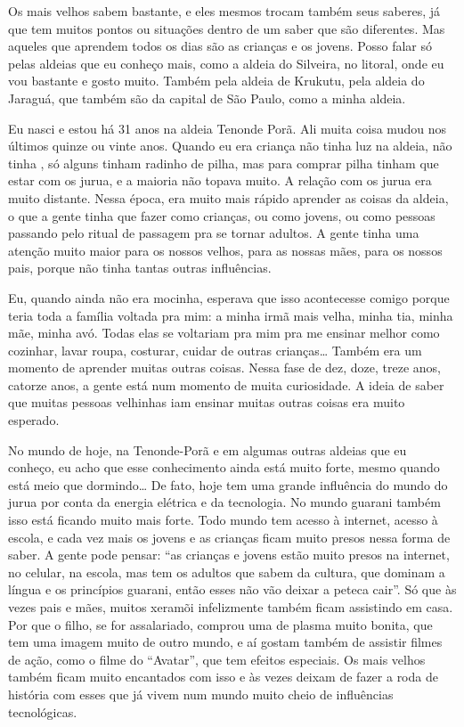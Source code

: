 Os mais velhos sabem bastante, e eles mesmos trocam também seus saberes,
já que tem muitos pontos ou situações dentro de um saber que são
diferentes. Mas aqueles que aprendem todos os dias são as crianças e os
jovens. Posso falar só pelas aldeias que eu conheço mais, como a aldeia
do Silveira, no litoral, onde eu vou bastante e gosto muito. Também
pela aldeia de Krukutu, pela aldeia do Jaraguá, que também são da
capital de São Paulo, como a minha aldeia.

Eu nasci e estou há 31 anos na aldeia Tenonde Porã. Ali muita coisa
mudou nos últimos quinze ou vinte anos. Quando eu era criança não tinha
luz na aldeia, não tinha , só alguns tinham radinho de pilha, mas
para comprar pilha tinham que estar com os jurua, e a maioria não
topava muito. A relação com os jurua era muito distante. Nessa época,
era muito mais rápido aprender as coisas da aldeia, o que a gente tinha
que fazer como crianças, ou como jovens, ou como pessoas passando pelo
ritual de passagem pra se tornar adultos. A gente tinha uma atenção
muito maior para os nossos velhos, para as nossas mães, para os nossos
pais, porque não tinha tantas outras influências.

Eu, quando ainda não era mocinha, esperava que isso acontecesse comigo
porque teria toda a família voltada pra mim: a minha irmã mais velha,
minha tia, minha mãe, minha avó. Todas elas se voltariam pra mim pra me
ensinar melhor como cozinhar, lavar roupa, costurar, cuidar de outras
crianças\ldots{} Também era um momento de aprender muitas outras coisas.
Nessa fase de dez, doze, treze anos, catorze anos, a gente está num
momento de muita curiosidade. A ideia de saber que muitas pessoas
velhinhas iam ensinar muitas outras coisas era muito esperado.

No mundo de hoje, na Tenonde-Porã e em algumas outras aldeias que eu
conheço, eu acho que esse conhecimento ainda está muito forte, mesmo
quando está meio que dormindo\ldots{} De fato, hoje tem uma grande
influência do mundo do jurua por conta da energia elétrica e da
tecnologia. No mundo guarani também isso está ficando muito mais forte.
Todo mundo tem acesso à internet, acesso à escola, e cada vez mais os
jovens e as crianças ficam muito presos nessa forma de saber. A gente
pode pensar: ``as crianças e jovens estão muito presos na internet, no
celular, na escola, mas tem os adultos que sabem da cultura, que
dominam a língua e os princípios guarani, então esses não vão deixar a
peteca cair''. Só que às vezes pais e mães, muitos xeramõi infelizmente
também ficam assistindo  em casa. Por que o filho, se for
assalariado, comprou uma  de plasma muito bonita, que tem uma imagem
muito de outro mundo, e aí gostam também de assistir filmes de ação,
como o filme do ``Avatar'', que tem efeitos especiais. Os mais velhos
também ficam muito encantados com isso e às vezes deixam de fazer a
roda de história com esses que já vivem num mundo muito cheio de
influências tecnológicas. 

